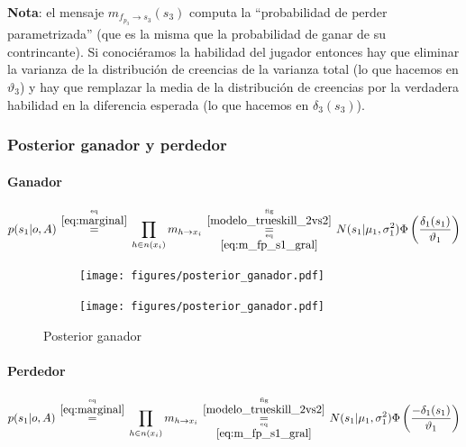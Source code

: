 \documentclass[article]{jss}
\newcommand\hfrac[2]{\genfrac{}{}{0pt}{}{#1}{#2}} %
\begin{document}
\begin{appendix}
\textbf{Nota}: el mensaje $m_{f_{p_3} \rightarrow s_3}(s_3)$ computa la ``probabilidad de perder parametrizada'' (que es la misma que la probabilidad de ganar de su contrincante). Si conoci\'eramos la habilidad del jugador entonces hay que eliminar la varianza de la distribuci\'on de creencias de la varianza total (lo que hacemos en $\vartheta_3$) y hay que remplazar la media de la distribuci\'on de creencias por la verdadera habilidad en la diferencia esperada (lo que hacemos en $\delta_3(s_3)$).

\subsubsection{Posterior ganador y perdedor}
\paragraph{Ganador}
\begin{equation}\label{eq:posterior_ganador}
 p(s_1|o,A) \overset{\hfrac{\text{eq}}{\ref{eq:marginal}}}{=} \prod_{h \in n(x_i)} m_{h \rightarrow x_i} \overset{\hfrac{\text{fig}}{\ref{modelo_trueskill_2vs2}}}{\underset{\hfrac{\text{eq}}{\ref{eq:m_fp_s1_gral}}}{=}}  N(s_1| \mu_1, \sigma_1^2)  \Phi\left(\frac{\delta_1(s_1)}{\vartheta_1}\right)
\end{equation}


\begin{figure}[t!]
\centering
  \begin{subfigure}[t]{0.48\textwidth}
  \texttt{[image: figures/posterior\_ganador.pdf]}
  \caption{}
  \label{posterior_ganador_image}
  \end{subfigure}
  \begin{subfigure}[t]{0.48\textwidth}
  \texttt{[image: figures/posterior\_ganador.pdf]}
  \caption{}
  \label{posterior_ganador_distribution}
  \end{subfigure}
  \caption{Posterior ganador}
  \label{posterior_ganador}
\end{figure}

\paragraph{Perdedor}

\begin{equation}\label{eq:posterior_perdedor}
 p(s_1|o,A) \overset{\hfrac{\text{eq}}{\ref{eq:marginal}}}{=} \prod_{h \in n(x_i)} m_{h \rightarrow x_i} \overset{\hfrac{\text{fig}}{\ref{modelo_trueskill_2vs2}}}{\underset{\hfrac{\text{eq}}{\ref{eq:m_fp_s1_gral}}}{=}}  N(s_1| \mu_1, \sigma_1^2)  \Phi\left(\frac{-\delta_1(s_1)}{\vartheta_1}\right)
\end{equation}



\end{appendix}
\end{document}
